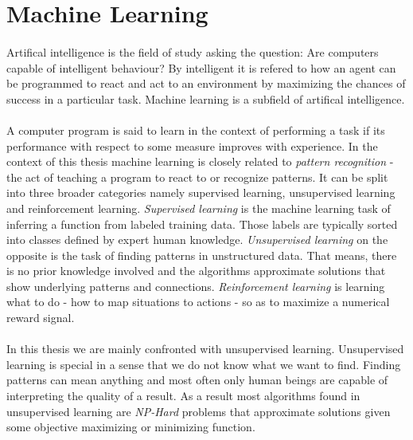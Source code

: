 \section{Machine Learning}
\label{sec:ml_intro}
  \paragraph{} Artifical intelligence is the field of study asking the question: Are computers capable of intelligent behaviour? By intelligent it is refered to how an agent can be programmed to react and act to an environment by maximizing the chances of success in a particular task. Machine learning is a subfield of artifical intelligence.

  \paragraph{} A computer program is said to learn in the context of performing a task if its performance with respect to some measure improves with experience. In the context of this thesis machine learning is closely related to \emph{pattern recognition} - the act of teaching a program to react to or recognize patterns. It can be split into three broader categories namely supervised learning, unsupervised learning and reinforcement learning. \emph{Supervised learning} is the machine learning task of inferring a function from labeled training data. Those labels are typically sorted into classes defined by expert human knowledge. \emph{Unsupervised learning} on the opposite is the task of finding patterns in unstructured data. That means, there is no prior knowledge involved and the algorithms approximate solutions that show underlying patterns and connections. \emph{Reinforcement learning} is learning what to do - how to map situations to actions - so as to maximize a numerical reward signal.

  \paragraph{} In this thesis we are mainly confronted with unsupervised learning. Unsupervised learning is special in a sense that we do not know what we want to find. Finding patterns can mean anything and most often only human beings are capable of interpreting the quality of a result. As a result most algorithms found in unsupervised learning are \emph{NP-Hard} problems that approximate solutions given some objective maximizing or minimizing function.

